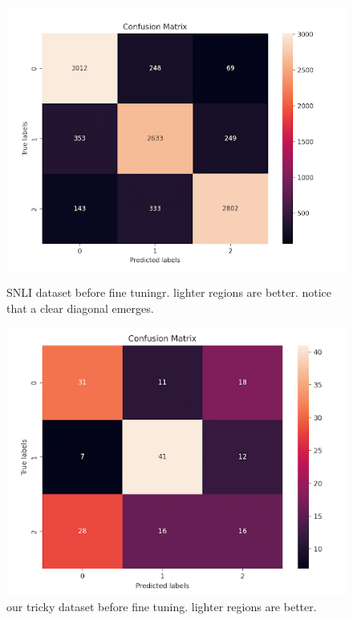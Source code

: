 \documentclass{article}
\begin{document}
\begin{figure}[!h]
	\centering
	\begin{minipage}{0.45\textwidth}
		\includegraphics[width=\linewidth]{images/confusion_trained_snli.png}
		\caption{SNLI dataset before fine tuningr. lighter regions are better. notice that a clear diagonal emerges.}
	\end{minipage}
	\hfill
	\begin{minipage}{0.45\textwidth}
		\includegraphics[width=\linewidth]{images/confusion_trained_tricky.png}
		\caption{our tricky dataset before fine tuning. lighter regions are better.}
	\end{minipage}
\end{figure}
\end{document}
